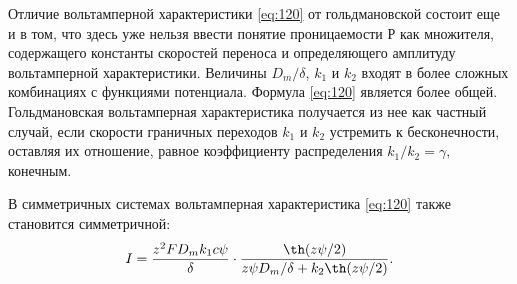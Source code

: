 Отличие вольтамперной характеристики \eqref{eq:120} от гольдмановской состоит еще и в
том, что здесь уже нельзя ввести понятие проницаемости Р как множителя,
содержащего константы скоростей переноса и определяющего амплитуду вольтамперной
характеристики. Величины \( D_m/\delta \), \( k_1 \) и \( k_2 \) входят в более
сложных комбинациях с функциями потенциала. Формула \eqref{eq:120} является более
общей. Гольдмановская вольтамперная характеристика получается из нее как частный
случай, если скорости граничных переходов \( k_1 \) и \( k_2 \) устремить к
бесконечности, оставляя их отношение, равное коэффициенту распределения
\( k_1/k_2= \gamma \), конечным.

В симметричных системах вольтамперная характеристика \eqref{eq:120} также становится
симметричной:
\[
    I = \frac{z^2FD_mk_1c\psi}{\delta}\cdot
    \frac{\th(z\psi/2)}{z\psi D_m/\delta + k_2\th(z\psi/2)}.
\]
